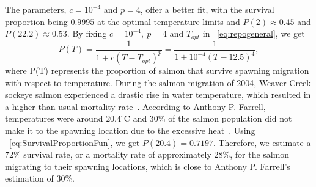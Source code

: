 The parameters, $c=10^{-4}$ and $p=4$, offer a better fit, with the survival proportion being $0.9995$ at the optimal temperature limits and $P(2) \approx 0.45$ and $P(22.2) \approx 0.53$.
By fixing $c=10^{-4},\ p=4$ and $T_{opt}$ in \equationautorefname~\eqref{eq:repogeneral}, we get
\begin{equation}\label{eq:SurvivalProportionFun}
    P(T) = \frac{1}{1+c(T-T_{opt})^p} = \frac{1}{1+10^{-4}(T-12.5)^4},
\end{equation}
where P(T) represents the proportion of salmon that survive spawning migration with respect to temperature.  
During the salmon migration of 2004, Weaver Creek sockeye salmon experienced a drastic rise in water temperature, which resulted in a higher than usual mortality rate~\cite{farrell2008pacific}.
According to Anthony P. Farrell, temperatures were around $20.4^{\circ}$C and 30\% of the salmon population did not make it to the spawning location due to the excessive heat~\cite{farrell2008pacific}.
Using \equationautorefname~\eqref{eq:SurvivalProportionFun}, we get $P(20.4)=0.7197$.
Therefore, we estimate a 72\% survival rate, or a mortality rate of approximately 28\%, for the salmon migrating to their spawning locations, which is close to Anthony P. Farrell's estimation of 30\%.

